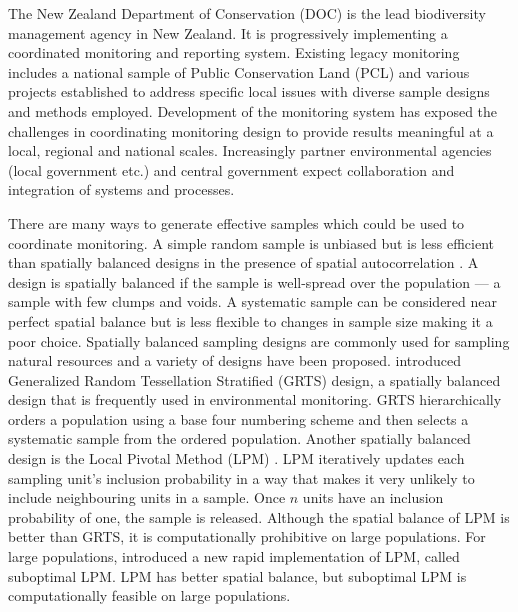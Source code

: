 \documentclass[titlepage]{article}
\begin{document}
The New Zealand Department of Conservation (DOC) is the lead biodiversity management agency in New Zealand. It is progressively implementing a coordinated monitoring and reporting system. Existing legacy monitoring includes a national sample of Public Conservation Land (PCL) and various projects established to address specific local issues with diverse sample designs and methods employed. Development of the monitoring system has exposed the challenges in coordinating monitoring design to provide results meaningful at a local, regional and national scales. Increasingly partner environmental agencies (local government etc.) and central government expect collaboration and integration of systems and processes. 

There are many ways to generate effective samples which could be used to coordinate monitoring. A simple random sample is unbiased but is less efficient than spatially balanced designs in the presence of spatial autocorrelation \citep{Grafstrom2013}. A design is spatially balanced if the sample is well-spread over the population --- a sample with few clumps and voids. A systematic sample can be considered near perfect spatial balance but is less flexible to changes in sample size making it a poor choice. Spatially balanced sampling designs are commonly used for sampling natural resources and a variety of designs have been proposed. \cite{StevensOlsen2004} introduced Generalized Random Tessellation Stratified (GRTS) design, a spatially balanced design that is frequently used in environmental monitoring. GRTS hierarchically orders a population using a base four numbering scheme and then selects a systematic sample from the ordered population. Another spatially balanced design is the Local Pivotal Method (LPM) \citep{Grafstrom2012}. LPM iteratively updates each sampling unit's inclusion probability in a way that makes it very unlikely to include neighbouring units in a sample. Once $n$ units have an inclusion probability of one, the sample is released. Although the spatial balance of LPM is better than GRTS, it is computationally prohibitive on large populations. For large populations, \cite{Grafstrom2014} introduced a new rapid implementation of LPM, called suboptimal LPM. LPM has better spatial balance, but suboptimal LPM is computationally feasible on large populations.
\end{document}
